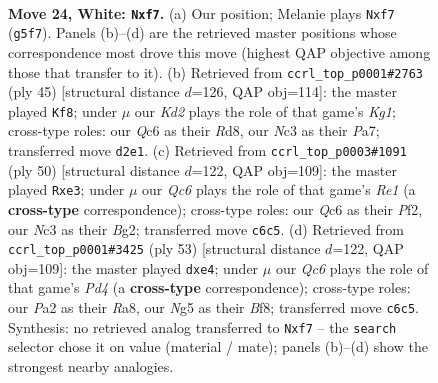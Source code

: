 \documentclass[11pt]{article}
\begin{document}
\clearpage

\begin{figure}[p]\centering
\begin{subfigure}{0.46\textwidth}\centering
\resizebox{\linewidth}{!}{%
\newchessgame
\chessboard[
  setfen={r2q1b2/3nkpr1/2Qn2p1/2pP2N1/4P3/1PN5/P2K4/5R1R w - - 0 24},
  showmover=false,
  pgfstyle=straightmove, color=movearrow, markmove={g5-f7}
]}
\caption{}
\end{subfigure}\hfill
\begin{subfigure}{0.46\textwidth}\centering
\resizebox{\linewidth}{!}{%
\newchessgame
\chessboard[
  setfen={3r2k1/pp2rppp/2nN1n2/8/1qB5/4P2P/3RQPP1/3R2K1 b - - 2 23},
  showmover=false,
  pgfstyle=straightmove, color=movearrow, markmove={g8-f8}
]}
\caption{}
\end{subfigure}
\\[4pt]
\begin{subfigure}{0.46\textwidth}\centering
\resizebox{\linewidth}{!}{%
\newchessgame
\chessboard[
  setfen={rr2q1k1/3b1pbp/3Qn1p1/1P2p3/4P3/2N1nNP1/5PBP/1R2R1K1 w - - 0 26},
  showmover=false,
  pgfstyle=straightmove, color=movearrow, markmove={e1-e3}
]}
\caption{}
\end{subfigure}\hfill
\begin{subfigure}{0.46\textwidth}\centering
\resizebox{\linewidth}{!}{%
\newchessgame
\chessboard[
  setfen={r4bk1/3n1p2/r1p4p/2Ppq1p1/1P1NN3/7P/2Q2BP1/1R2R1K1 b - - 0 27},
  showmover=false,
  pgfstyle=straightmove, color=movearrow, markmove={d5-e4}
]}
\caption{}
\end{subfigure}
\caption{\textbf{Move 24, White: \texttt{Nxf7}.} (a) Our position; Melanie plays \texttt{Nxf7} (\texttt{g5f7}). Panels (b)--(d) are the retrieved master positions whose correspondence most drove this move (highest QAP objective among those that transfer to it). (b) Retrieved from \texttt{ccrl\_top\_p0001\#2763} (ply 45) [structural distance $d$=126, QAP obj=114]: the master played \texttt{Kf8}; under $\mu$ our \emph{Kd2} plays the role of that game's \emph{Kg1}; cross-type roles: our \emph{Q}c6 as their \emph{R}d8, our \emph{N}c3 as their \emph{P}a7; transferred move \texttt{d2e1}. (c) Retrieved from \texttt{ccrl\_top\_p0003\#1091} (ply 50) [structural distance $d$=122, QAP obj=109]: the master played \texttt{Rxe3}; under $\mu$ our \emph{Qc6} plays the role of that game's \emph{Re1} (a \textbf{cross-type} correspondence); cross-type roles: our \emph{Q}c6 as their \emph{P}f2, our \emph{N}c3 as their \emph{B}g2; transferred move \texttt{c6c5}. (d) Retrieved from \texttt{ccrl\_top\_p0001\#3425} (ply 53) [structural distance $d$=122, QAP obj=109]: the master played \texttt{dxe4}; under $\mu$ our \emph{Qc6} plays the role of that game's \emph{Pd4} (a \textbf{cross-type} correspondence); cross-type roles: our \emph{P}a2 as their \emph{R}a8, our \emph{N}g5 as their \emph{B}f8; transferred move \texttt{c6c5}. Synthesis: no retrieved analog transferred to \texttt{Nxf7} -- the \texttt{search} selector chose it on value (material / mate); panels (b)--(d) show the strongest nearby analogies.}
\label{fig:thought-m46}
\end{figure}
\end{document}
